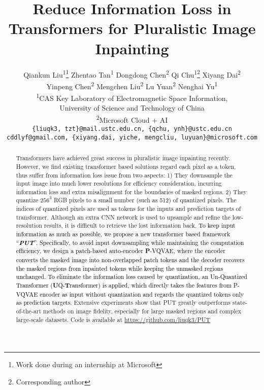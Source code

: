 \documentclass[10pt,twocolumn,letterpaper]{article}
\newcommand{\qiankun}[1]{\textcolor{black}{#1}}
\newcommand{\qchu}[1]{\textcolor{black}{#1}}
\begin{document}
\title{Reduce Information Loss in Transformers for Pluralistic Image Inpainting}

\author{Qiankun Liu\textsuperscript{1}\thanks{Work done during an internship at Microsoft} \quad Zhentao Tan\textsuperscript{1} \quad Dongdong Chen\textsuperscript{2} \quad Qi Chu\textsuperscript{1}\thanks{Corresponding author} \quad Xiyang Dai\textsuperscript{2} \\ 
Yinpeng Chen\textsuperscript{2} \quad Mengchen Liu\textsuperscript{2} \quad Lu Yuan\textsuperscript{2} \quad Nenghai Yu\textsuperscript{1} \\
\textsuperscript{1}CAS Key Laboratory of Electromagnetic Space Information, \\University of Science and Technology of China \\
\textsuperscript{2}Microsoft Cloud + AI \\
{\tt\small \{liuqk3, tzt\}@mail.ustc.edu.cn, \{qchu, ynh\}@ustc.edu.cn} \\
{\tt\small  cddlyf@gmail.com, \{xiyang.dai,  yiche, mengcliu, luyuan\}@microsoft.com}
}



\maketitle

\begin{abstract}
Transformers have achieved great success in pluralistic image inpainting recently.
However, we find existing transformer based solutions regard each pixel as a token, thus suffer from information loss issue from two aspects: 
1) They downsample the input image into much
lower resolutions for efficiency consideration, incurring information loss and extra misalignment 
for the boundaries of masked regions.
2) They quantize $256^3$ RGB pixels to a small number (such as 512) of quantized pixels. The indices of quantized pixels are used as tokens for the inputs and prediction targets of transformer.
Although an extra CNN network is used to upsample and refine the low-resolution results, it is difficult to retrieve the lost information back.
\qchu{\qiankun{To keep input information as much as possible, we propose a new transformer based framework ``\textit{\textbf{PUT}}''.} 
Specifically, to avoid input downsampling while maintaining the computation efficiency, we design a patch-based auto-encoder \textbf{P}-VQVAE, where the encoder converts the masked image into non-overlapped patch tokens and the decoder recovers the masked regions from inpainted tokens while keeping the unmasked regions unchanged. To eliminate the information loss caused by quantization, an Un-Quantized Transformer (\textbf{U}Q-\textbf{T}ransformer) is applied, which directly takes the features from P-VQVAE encoder as input without quantization and regards the quantized tokens only as prediction targets.}
Extensive experiments show that PUT greatly outperforms state-of-the-art methods on image fidelity, especially for large masked regions and complex large-scale datasets. Code is available at \url{https://github.com/liuqk3/PUT}
\end{abstract}
\vspace{-20pt}
\end{document}
